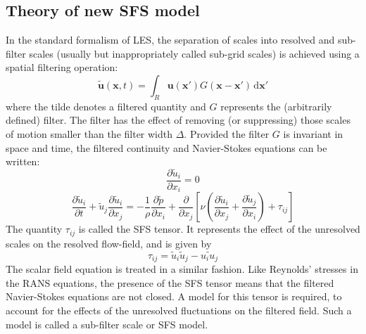 \subsection{Theory of new SFS model}
\label{SFSm} In the standard formalism of LES, the separation of
scales into resolved and sub-filter scales (usually but
inappropriately called sub-grid scales) is achieved using a
spatial filtering operation:
\begin{equation}
\mathbf{\tilde{u}}(\mathbf{x},t)= \int_{R} \mathbf{u}(\mathbf{x}')
G(\mathbf{x}-\mathbf{x}')\,\mathrm{d}\mathbf{x}'
\label{eq:Les-filter}
\end{equation}
where the tilde denotes a filtered quantity and $G$ represents the
(arbitrarily defined) filter. The filter has the effect of
removing (or suppressing) those scales of motion smaller than the
filter width $\Delta$. Provided the filter $G$ is invariant in
space and time\label{homo}, the filtered continuity and
Navier-Stokes equations can be written:
\begin{equation}
\frac{\partial \tilde{u}_i}{\partial x_i}=0
\end{equation}
\begin{equation}
\frac{\partial \tilde{u}_i}{\partial t}+ \tilde{u}_j
\frac{\partial \tilde{u}_i}{\partial x_j}= -\frac{1}{\rho}
\frac{\partial \tilde{p}}{\partial x_i}+ \frac{\partial}{\partial
x_j} \left[\nu\left(\frac{\partial \tilde{u}_i}{\partial x_j}+
\frac{\partial \tilde{u}_j}{\partial x_i}\right)+\tau_{ij}\right]
\label{eq:Les-NS2}
\end{equation}
The quantity $\tau_{ij}$ is called the SFS tensor. It represents
the effect of the unresolved scales on the resolved flow-field,
and is given by
\begin{equation}
\tau_{ij} = \tilde{u}_i \tilde{u}_j - \widetilde{u_i u_j}
\end{equation}
The scalar field equation is treated in a similar fashion. Like
Reynolds' stresses in the RANS equations, the presence of the SFS
tensor means that the filtered Navier-Stokes equations are not
closed. A model for this tensor is required, to account for the
effects of the unresolved fluctuations on the filtered field. Such
a model is called a sub-filter scale or SFS model.

